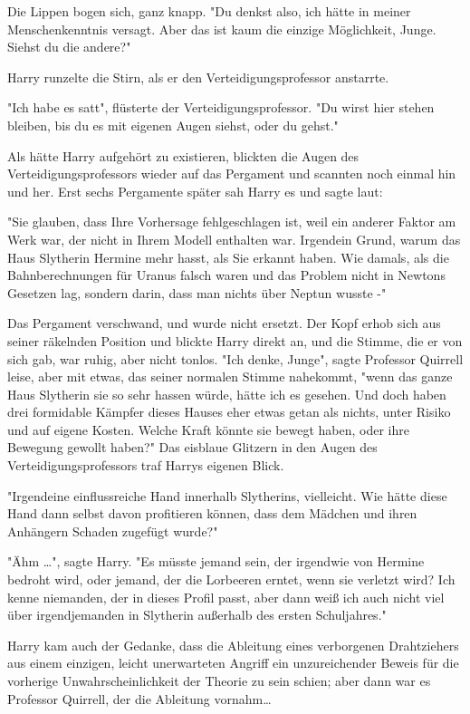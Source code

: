 {Die Lippen bogen sich, ganz knapp. "Du denkst also, ich hätte in meiner Menschenkenntnis versagt. Aber das ist kaum die einzige Möglichkeit, Junge. Siehst du die andere?"

Harry runzelte die Stirn, als er den Verteidigungsprofessor anstarrte.

"Ich habe es satt", flüsterte der Verteidigungsprofessor. "Du wirst hier stehen bleiben, bis du es mit eigenen Augen siehst, oder du gehst."

Als hätte Harry aufgehört zu existieren, blickten die Augen des Verteidigungsprofessors wieder auf das Pergament und scannten noch einmal hin und her. Erst sechs Pergamente später sah Harry es und sagte laut:

"Sie glauben, dass Ihre Vorhersage fehlgeschlagen ist, weil ein anderer Faktor am Werk war, der nicht in Ihrem Modell enthalten war. Irgendein Grund, warum das Haus Slytherin Hermine mehr hasst, als Sie erkannt haben. Wie damals, als die Bahnberechnungen für Uranus falsch waren und das Problem nicht in Newtons Gesetzen lag, sondern darin, dass man nichts über Neptun wusste -"

Das Pergament verschwand, und wurde nicht ersetzt. Der Kopf erhob sich aus seiner räkelnden Position und blickte Harry direkt an, und die Stimme, die er von sich gab, war ruhig, aber nicht tonlos. "Ich denke, Junge", sagte Professor Quirrell leise, aber mit etwas, das seiner normalen Stimme nahekommt, "wenn das ganze Haus Slytherin sie so sehr hassen würde, hätte ich es gesehen. Und doch haben drei formidable Kämpfer dieses Hauses eher etwas getan als nichts, unter Risiko und auf eigene Kosten. Welche Kraft könnte sie bewegt haben, oder ihre Bewegung gewollt haben?" Das eisblaue Glitzern in den Augen des Verteidigungsprofessors traf Harrys eigenen Blick.

"Irgendeine einflussreiche Hand innerhalb Slytherins, vielleicht. Wie hätte diese Hand dann selbst davon profitieren können, dass dem Mädchen und ihren Anhängern Schaden zugefügt wurde?"

"Ähm …", sagte Harry. "Es müsste jemand sein, der irgendwie von Hermine bedroht wird, oder jemand, der die Lorbeeren erntet, wenn sie verletzt wird? Ich kenne niemanden, der in dieses Profil passt, aber dann weiß ich auch nicht viel über irgendjemanden in Slytherin außerhalb des ersten Schuljahres."

Harry kam auch der Gedanke, dass die Ableitung eines verborgenen Drahtziehers aus einem einzigen, leicht unerwarteten Angriff ein unzureichender Beweis für die vorherige Unwahrscheinlichkeit der Theorie zu sein schien; aber dann war es Professor Quirrell, der die Ableitung vornahm…

}
